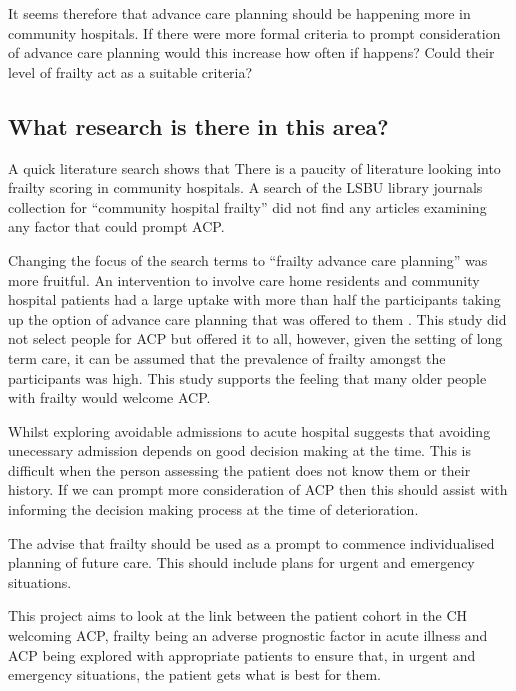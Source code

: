 \documentclass
[
	12pt,
	a4paper,
	oneside,
]{report}
\begin{document}
It seems therefore that advance care planning should be happening more in community
hospitals. If there were more formal criteria to prompt consideration
of advance care planning would this increase how often if happens? Could their 
level of frailty act as a suitable criteria?

\subsection{What research is there in this area?}

A quick literature search shows that There is a paucity of literature looking 
into frailty scoring in community hospitals.
A search of the LSBU library journals collection for ``community hospital frailty''
did not find any articles examining any factor that could prompt ACP.

Changing the focus of the search terms to ``frailty advance care planning''
was more fruitful.
An intervention to involve care home residents and community hospital patients
had a large uptake with more than half the participants taking up the option of
advance care planning that was offered to them \textcite{mcglade:17}. This 
study did not select people for ACP but offered it to all, however, given the 
setting of long term care, it can be assumed that the prevalence of frailty
amongst the participants was high. This study supports the feeling that many
older people with frailty would welcome ACP.

Whilst exploring avoidable admissions to acute hospital \textcite{mytton:12} 
suggests that avoiding unecessary admission depends on good decision making at 
the time. This is difficult when the person assessing the patient does not know
them or their history. If we can prompt more consideration of ACP then this 
should assist with informing the decision making process at the time of 
deterioration.

The \textcite{bgs:14} advise that frailty should be used as a prompt to
commence individualised planning of future care. This should include plans
for urgent and emergency situations.

This project aims to look at the link between the patient cohort in the CH
welcoming ACP, frailty being an adverse prognostic factor in acute illness and
ACP being explored with appropriate patients to ensure that, in urgent and 
emergency situations, the patient gets what is best for them.

\end{document}
